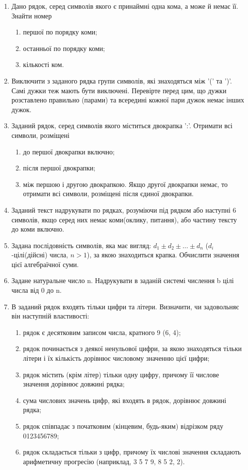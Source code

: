 \documentclass[]{article}
\makeatletter
\newcommand{\xslalph}[1]{\expandafter\@xslalph\csname c@#1\endcsname}
\newcommand{\@xslalph}[1]{%
    \ifcase#1\or а\or б\or в\or г\or д\or e\or є\or ж\or з\or i%
    \or й\or к\or л\or м\or н\or о\or п\or р\or с\or т%
    \or у\or ф\or х\or ц\or ч\or ш\or ю\or я\or аа\or бб\or вв %
    \else\@ctrerr\fi%
}
\makeatother
\begin{document}
\begin{enumerate}
\item  Дано рядок, серед символів якого є принаймні одна кома, а може й немає її. Знайти номер

 \begin{enumerate}[label=\xslalph*)]
 \item першої по порядку коми;
 \item останньої по порядку коми;
 \item кількості ком.
 \end{enumerate}

\item  Виключити з заданого рядка групи символів, які знаходяться між '(' та ')'. Самі дужки теж мають бути виключені. Перевірте перед цим, що дужки розставлено правильно (парами) та всередині кожної пари дужок немає інших дужок.
\item  Заданий рядок, серед символів якого міститься двокрапка ':'. Отримати всі символи, розміщені
\begin{enumerate}[label=\xslalph*)]
\item до першої двокрапки включно;
\item після першої двокрапки;
\item між першою і другою двокрапкою. Якщо другої двокрапки немає, то отримати всі символи, розміщені після єдиної двокрапки.
\end{enumerate}
\item  Заданий текст надрукувати по рядках, розуміючи під рядком або наступні 6 символів, якщо серед них немає коми(оклику, питання), або частину тексту до коми включно.
\item  Задана послідовність символів, яка має вигляд:
  $d_1 \pm d_2 \pm \ldots \pm d_{n}$
($d_i$-цілі(дійсні) числа, $n>1$), за якою знаходиться крапка. Обчислити значення цієї алгебраїчної суми.
\item  Задане натуральне число n. Надрукувати в заданій системі числення b цілі числа від 0 до n.
\item  В заданий рядок входять тільки цифри та літери. Визначити, чи задовольняє він наступній властивості:
\begin{enumerate}[label=\xslalph*)]
\item
 рядок є десятковим записом числа, кратного 9 (6, 4);
\item рядок починається з деякої ненульової цифри, за якою знаходяться тільки літери і їх кількість дорівнює числовому значенню цієї цифри;
\item рядок містить (крім літер) тільки одну цифру, причому її числове значення дорівнює довжині рядка;
\item сума числових значень цифр, які входять в рядок, дорівнює довжині рядка;
\item рядок співпадає з початковим (кінцевим, будь-яким) відрізком ряду 0123456789;
\item рядок складається тільки з цифр, причому їх числові значення складають арифметичну прогресію (наприклад, 3 5 7 9, 8 5 2, 2).


\end{enumerate}
\end{enumerate}
\end{document}
